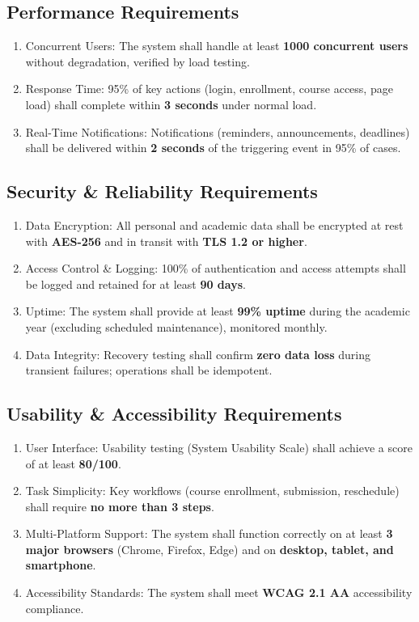 \subsection{Performance Requirements}
\begin{enumerate}[label=NFR\arabic*:, leftmargin=2.5cm]
  \item Concurrent Users: The system shall handle at least \textbf{1000 concurrent users} without degradation, verified by load testing.
  \item Response Time: 95\% of key actions (login, enrollment, course access, page load) shall complete within \textbf{3 seconds} under normal load.
  \item Real-Time Notifications: Notifications (reminders, announcements, deadlines) shall be delivered within \textbf{2 seconds} of the triggering event in 95\% of cases.
\end{enumerate}

\subsection{Security \& Reliability Requirements}
\begin{enumerate}[label=NFR\arabic*:, start=4, leftmargin=2.5cm]
  \item Data Encryption: All personal and academic data shall be encrypted at rest with \textbf{AES-256} and in transit with \textbf{TLS 1.2 or higher}.
  \item Access Control \& Logging: 100\% of authentication and access attempts shall be logged and retained for at least \textbf{90 days}.
  \item Uptime: The system shall provide at least \textbf{99\% uptime} during the academic year (excluding scheduled maintenance), monitored monthly.
  \item Data Integrity: Recovery testing shall confirm \textbf{zero data loss} during transient failures; operations shall be idempotent.
\end{enumerate}

\subsection{Usability \& Accessibility Requirements}
\begin{enumerate}[label=NFR\arabic*:, start=8, leftmargin=2.5cm]
  \item User Interface: Usability testing (System Usability Scale) shall achieve a score of at least \textbf{80/100}.
  \item Task Simplicity: Key workflows (course enrollment, submission, reschedule) shall require \textbf{no more than 3 steps}.
  \item Multi-Platform Support: The system shall function correctly on at least \textbf{3 major browsers} (Chrome, Firefox, Edge) and on \textbf{desktop, tablet, and smartphone}.
  \item Accessibility Standards: The system shall meet \textbf{WCAG 2.1 AA} accessibility compliance.
\end{enumerate}

